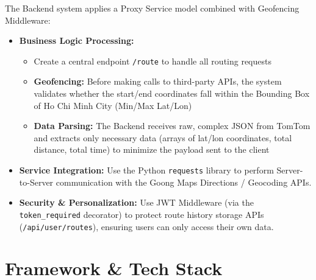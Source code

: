 The Backend system applies a Proxy Service model combined with Geofencing Middleware:

\begin{itemize}
    \item \textbf{Business Logic Processing:}
    \begin{itemize}
        \item Create a central endpoint \texttt{/route} to handle all routing requests
        \item \textbf{Geofencing:} Before making calls to third-party APIs, the system validates whether the start/end coordinates fall within the Bounding Box of Ho Chi Minh City (Min/Max Lat/Lon)
        \item \textbf{Data Parsing:} The Backend receives raw, complex JSON from TomTom and extracts only necessary data (arrays of lat/lon coordinates, total distance, total time) to minimize the payload sent to the client
    \end{itemize}
    
    \item \textbf{Service Integration:} Use the Python \texttt{requests} library to perform Server-to-Server communication with the Goong Maps Directions / Geocoding APIs.
    
    \item \textbf{Security \& Personalization:} Use JWT Middleware (via the \texttt{token\_required} decorator) to protect route history storage APIs (\texttt{/api/user/routes}), ensuring users can only access their own data.
\end{itemize}

\section{Framework \& Tech Stack}

